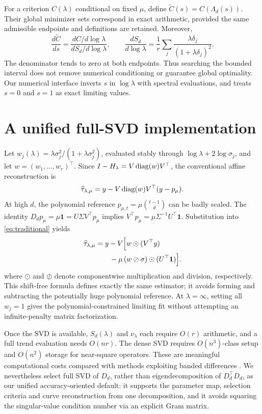 For a criterion $C(\lambda)$ conditional on fixed $\mu$, define $\widetilde C(s)=C(\Lambda_d(s))$. Their global minimizer sets correspond in exact arithmetic, provided the same admissible endpoints and definitions are retained. Moreover,
\begin{equation}\label{eq:chain}
\frac{d\widetilde C}{ds}
=\frac{dC/d\log\lambda}{dS_d/d\log\lambda},
\qquad
\frac{dS_d}{d\log\lambda}
=\frac1r\sum_j
\frac{\lambda\delta_j}{(1+\lambda\delta_j)^2}.
\end{equation}
The denominator tends to zero at both endpoints. Thus searching the bounded interval does not remove numerical conditioning or guarantee global optimality. Our numerical interface inverts $s$ in $\log\lambda$ with spectral evaluations, and treats $s=0$ and $s=1$ as exact limiting values.

\section{A unified full-SVD implementation}\label{sec:svd}
Let $w_j(\lambda)=\lambda\sigma_j^2/(1+\lambda\sigma_j^2)$, evaluated stably through $\log\lambda+2\log\sigma_j$, and let $w=(w_1,\ldots,w_r)^\top$. Since $I-H_\lambda=V\operatorname{diag}(w)V^\top$, the conventional affine reconstruction is
\begin{equation}\label{eq:traditional}
\widehat\tau_{\lambda,\mu}
=y-V\operatorname{diag}(w)V^\top(y-p_\mu).
\end{equation}
At high $d$, the polynomial reference $p_{\mu,t}=\mu\binom{t-1}{d}$ can be badly scaled. The identity
$D_dp_\mu=\mu\mathbf1=U\Sigma V^\top p_\mu$
implies $V^\top p_\mu=\mu\Sigma^{-1}U^\top\mathbf1$. Substitution into \eqref{eq:traditional} yields
\begin{equation}\label{eq:shiftfree}
\begin{aligned}
\widehat\tau_{\lambda,\mu}
&=y-V\Bigl[
  w\odot(V^\top y)\\
&\qquad-\mu\,(w\oslash\sigma)\odot(U^\top\mathbf1)
  \Bigr].
\end{aligned}
\end{equation}
where $\odot$ and $\oslash$ denote componentwise multiplication and division, respectively. This shift-free formula defines exactly the same estimator; it avoids forming and subtracting the potentially huge polynomial reference. At $\lambda=\infty$, setting all $w_j=1$ gives the polynomial-constrained limiting fit without attempting an infinite-penalty matrix factorization.

Once the SVD is available, $S_d(\lambda)$ and $\nu_\lambda$ each require $O(r)$ arithmetic, and a full trend evaluation needs $O(nr)$. The dense SVD requires $O(n^3)$-class setup and $O(n^2)$ storage for near-square operators. These are meaningful computational costs compared with methods exploiting banded differences \citep{weinert2007,biessy2026}. We nevertheless select full SVD of $D_d$, rather than eigendecomposition of $D_d^\top D_d$, as our unified accuracy-oriented default: it supports the parameter map, selection criteria and curve reconstruction from one decomposition, and it avoids squaring the singular-value condition number via an explicit Gram matrix.
